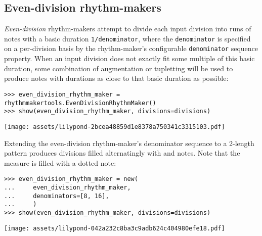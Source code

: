 \subsection{Even-division rhythm-makers}
\label{ssec:even-division-rhythm-makers}

\emph{Even-division} rhythm-makers attempt to divide each input division into
runs of notes with a basic duration \texttt{1/denominator}, where the
\texttt{denominator} is specified on a per-division basis by the rhythm-maker's
configurable \texttt{denominator} sequence property. When an input division
does not exactly fit some multiple of this basic duration, some combination of
augmentation or tupletting will be used to produce notes with durations as
close to that basic duration as possible:

\begin{comment}
<abjad>
even_division_rhythm_maker = rhythmmakertools.EvenDivisionRhythmMaker()
show(even_division_rhythm_maker, divisions=divisions)
</abjad>
\end{comment}

\begin{abjadbookoutput}
\begin{singlespacing}
\vspace{-0.5\baselineskip}
\begin{verbatim}
>>> even_division_rhythm_maker = rhythmmakertools.EvenDivisionRhythmMaker()
>>> show(even_division_rhythm_maker, divisions=divisions)
\end{verbatim}
\noindent\texttt{[image: assets/lilypond-2bcea48859d1e8378a750341c3315103.pdf]}
\end{singlespacing}
\end{abjadbookoutput}

\noindent Extending the even-division rhythm-maker's denominator sequence to a
2-length pattern produces divisions filled alternatingly with  and
 notes. Note that the  measure is filled with a
dotted  note:

\begin{comment}
<abjad>
even_division_rhythm_maker = new(
    even_division_rhythm_maker,
    denominators=[8, 16],
    )
show(even_division_rhythm_maker, divisions=divisions)
</abjad>
\end{comment}

\begin{abjadbookoutput}
\begin{singlespacing}
\vspace{-0.5\baselineskip}
\begin{verbatim}
>>> even_division_rhythm_maker = new(
...     even_division_rhythm_maker,
...     denominators=[8, 16],
...     )
>>> show(even_division_rhythm_maker, divisions=divisions)
\end{verbatim}
\noindent\texttt{[image: assets/lilypond-042a232c8ba3c9adb624c404980efe18.pdf]}
\end{singlespacing}
\end{abjadbookoutput}

